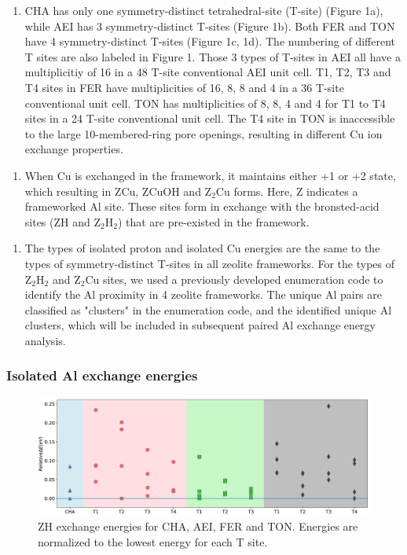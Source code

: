\documentclass[12pt]{article}
\begin{document}
\begin{enumerate}[resume]
\item CHA has only one symmetry-distinct tetrahedral-site (T-site) (Figure 1a), while AEI has 3 symmetry-distinct T-sites (Figure 1b). Both FER and TON have 4 symmetry-distinct T-sites (Figure 1c, 1d). The numbering of different T sites are also labeled in Figure 1. Those 3 types of T-sites in AEI all have a multiplicitiy of 16 in a 48 T-site conventional AEI unit cell. T1, T2, T3 and T4 sites in FER have multiplicities of 16, 8, 8 and 4 in a 36 T-site conventional unit cell. TON has multiplicities of 8, 8, 4 and 4 for T1 to T4 sites in a 24 T-site conventional unit cell. The T4 site in TON is inaccessible to the large 10-membered-ring pore openings, resulting in different Cu ion exchange properties.
\end{enumerate}

\begin{enumerate}[resume]
\item When Cu is exchanged in the framework, it maintains either +1 or +2 state, which resulting in ZCu, ZCuOH and Z$_{2}$Cu forms. Here, Z indicates a frameworked Al site. These sites form in exchange with the bronsted-acid sites (ZH and Z$_{2}$H$_{2}$) that are pre-existed in the framework.
\end{enumerate}

\begin{enumerate}[resume]
\item The types of isolated proton and isolated Cu energies are the same to the types of symmetry-distinct T-sites in all zeolite frameworks. For the types of Z$_{2}$H$_{2}$ and Z$_{2}$Cu sites, we used a previously developed enumeration code to identify the Al proximity in 4 zeolite frameworks.\cite{Paolucci2016} The unique Al pairs are classified as "clusters" in the enumeration code, and the identified unique Al clusters, which will be included in subsequent paired Al exchange energy analysis.
\end{enumerate}



\subsubsection*{Isolated Al exchange energies}
\begin{figure}[H]
\centering
  \includegraphics[width=5.2in]{./Figures/Figure-2}
  \caption{ZH exchange energies for CHA, AEI, FER and TON. Energies are normalized to the lowest energy for each T site.}
  \label{ZH energies}
\end{figure}
\end{document}
